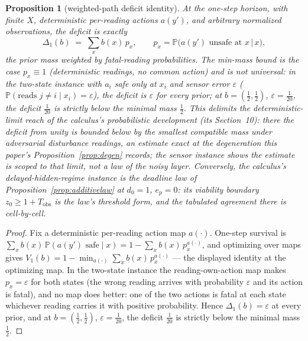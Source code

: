 \documentclass[10pt,twocolumn]{article}
\theoremstyle{plain}
\newtheorem{proposition}[theorem]{Proposition}
\theoremstyle{definition}
\theoremstyle{remark}
\begin{document}
\begin{proposition}[weighted-path deficit identity]\label{prop:pathdeficit}
At the one-step horizon, with finite \(X\), deterministic per-reading
actions \(a(y')\), and arbitrary normalized observations, the deficit
is exactly
\[
\Delta_{1}(b) \;=\; \sum_{x} b(x)\, p_{x},
\qquad p_{x} = \mathbb{P}\bigl(a(y') \text{ unsafe at } x \,\big|\, x\bigr),
\]
the prior mass weighted by fatal-reading probabilities. The min-mass
bound is the case \(p_{x} \equiv 1\) (deterministic readings, no
common action) and is \emph{not universal}: in the two-state instance
with \(a_{i}\) safe only at \(x_{i}\) and sensor error \(\varepsilon\)
(\(\mathbb{P}(\text{reads } j \ne i \mid x_{i}) = \varepsilon\)),
the deficit is \(\varepsilon\) for every prior; at
\(b = (\tfrac12, \tfrac12)\), \(\varepsilon = \tfrac1{20}\), the
deficit \(\tfrac1{20}\) is strictly below the minimal mass
\(\tfrac12\). This delimits the deterministic-limit reach of the
calculus's probabilistic development (its Section~10): there the
deficit from unity is bounded below by the smallest compatible mass
under adversarial disturbance readings, an estimate exact at the
degeneration this paper's Proposition~\ref{prop:degen} records; the
sensor instance shows the estimate is scoped to that limit, not a law
of the noisy layer. Conversely, the calculus's delayed-hidden-regime
instance is the deadline law of
Proposition~\ref{prop:additivelaw} at \(d_{0} = 1\), \(e_{p} = 0\):
its viability boundary \(z_{0} \ge 1 + T_{\mathrm{obs}}\) is the
law's threshold form, and the tabulated agreement there is
cell-by-cell.
\end{proposition}

\begin{proof}
Fix a deterministic per-reading action map \(a(\cdot)\). One-step
survival is \(\sum_{x} b(x)\, \mathbb{P}(a(y') \text{ safe} \mid x)
= 1 - \sum_{x} b(x)\, p_{x}^{a(\cdot)}\), and optimizing over maps
gives \(V_{1}(b) = 1 - \min_{a(\cdot)} \sum_{x} b(x)\,
p_{x}^{a(\cdot)}\) --- the displayed identity at the optimizing map. In
the two-state instance the reading-own-action map makes
\(p_{x} = \varepsilon\) for both states (the wrong reading arrives
with probability \(\varepsilon\) and its action is fatal), and no map
does better: one of the two actions is fatal at each state whichever
reading carries it with positive probability. Hence
\(\Delta_{1}(b) = \varepsilon\) at every prior, and at
\(b = (\tfrac12, \tfrac12)\), \(\varepsilon = \tfrac1{20}\), the
deficit \(\tfrac1{20}\) is strictly below the minimal mass
\(\tfrac12\).
\end{proof}
\end{document}
